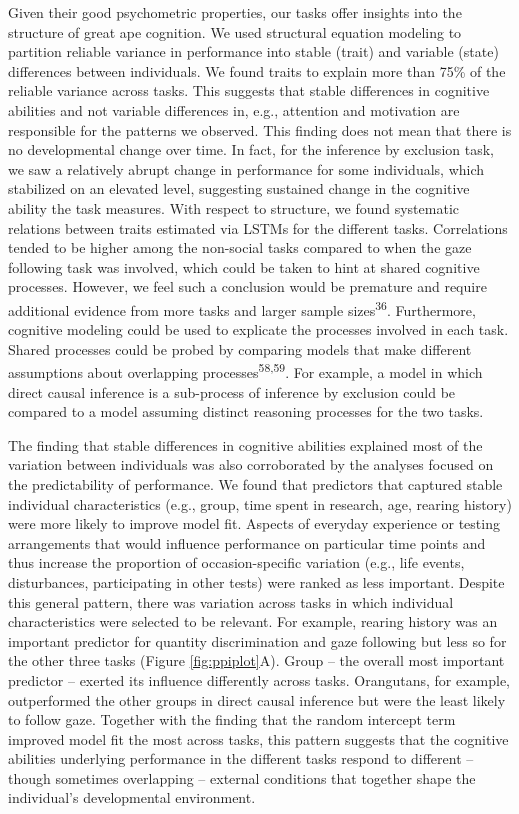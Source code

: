 \documentclass[
  man,floatsintext]{apa6}
\begin{document}
Given their good psychometric properties, our tasks offer insights into the structure of great ape cognition. We used structural equation modeling to partition reliable variance in performance into stable (trait) and variable (state) differences between individuals. We found traits to explain more than 75\% of the reliable variance across tasks. This suggests that stable differences in cognitive abilities and not variable differences in, e.g., attention and motivation are responsible for the patterns we observed. This finding does not mean that there is no developmental change over time. In fact, for the inference by exclusion task, we saw a relatively abrupt change in performance for some individuals, which stabilized on an elevated level, suggesting sustained change in the cognitive ability the task measures. With respect to structure, we found systematic relations between traits estimated via LSTMs for the different tasks. Correlations tended to be higher among the non-social tasks compared to when the gaze following task was involved, which could be taken to hint at shared cognitive processes. However, we feel such a conclusion would be premature and require additional evidence from more tasks and larger sample sizes\textsuperscript{36}. Furthermore, cognitive modeling could be used to explicate the processes involved in each task. Shared processes could be probed by comparing models that make different assumptions about overlapping processes\textsuperscript{58,59}. For example, a model in which direct causal inference is a sub-process of inference by exclusion could be compared to a model assuming distinct reasoning processes for the two tasks.

The finding that stable differences in cognitive abilities explained most of the variation between individuals was also corroborated by the analyses focused on the predictability of performance. We found that predictors that captured stable individual characteristics (e.g., group, time spent in research, age, rearing history) were more likely to improve model fit. Aspects of everyday experience or testing arrangements that would influence performance on particular time points and thus increase the proportion of occasion-specific variation (e.g., life events, disturbances, participating in other tests) were ranked as less important. Despite this general pattern, there was variation across tasks in which individual characteristics were selected to be relevant. For example, rearing history was an important predictor for quantity discrimination and gaze following but less so for the other three tasks (Figure \ref{fig:ppiplot}A). Group -- the overall most important predictor -- exerted its influence differently across tasks. Orangutans, for example, outperformed the other groups in direct causal inference but were the least likely to follow gaze. Together with the finding that the random intercept term improved model fit the most across tasks, this pattern suggests that the cognitive abilities underlying performance in the different tasks respond to different -- though sometimes overlapping -- external conditions that together shape the individual's developmental environment.
\end{document}
